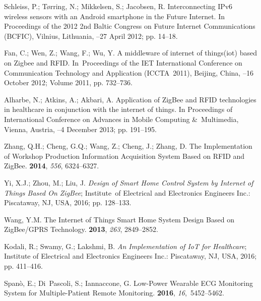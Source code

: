\documentclass[symmetry,article,accept,moreauthors,pdftex10pt,a4paper]{mdpi}
\begin{document}
\begin{thebibliography}{999}
Schleiss, P.; Tørring, N.; Mikkelsen, S.; Jacobsen, R.
\newblock Interconnecting IPv6 wireless sensors with an Android smartphone in
the Future Internet. In Proceedings of the 2012 2nd Baltic Congress on  Future Internet Communications (BCFIC), Vilnius, Lithuania, 
--27 April 2012; pp. 14--18.

Fan, C.; Wen, Z.; Wang, F.; Wu, Y.
\newblock A middleware of internet of things(iot) based on Zigbee and RFID. In~Proceedings of the IET International Conference on  Communication Technology and Application (ICCTA~2011),  Beijing, China,
--16 October 2012; Volume 2011, pp. 732--736.

Alharbe, N.; Atkins, A.; Akbari, A.
\newblock Application of ZigBee and RFID technologies in healthcare in
conjunction with the internet of things. In Proceedings of International Conference on Advances in Mobile Computing \&~Multimedia, Vienna, Austria,
--4 December 2013; pp. 191--195.

Zhang, Q.H.; Cheng, G.Q.; Wang, Z.; Cheng, J.; Zhang, D.
\newblock The Implementation of Workshop Production Information Acquisition
System Based on RFID and ZigBee.
 \textbf{2014}, \emph{556}, 6324--6327.

Yi, X.J.; Zhou, M.; Liu, J.
\newblock \emph{Design of Smart Home Control System by Internet of Things Based On
	ZigBee};
\newblock Institute~of Electrical and Electronics Engineers Inc.: Piscataway, NJ, USA, 2016; pp.
128--133.

Wang, Y.M.
\newblock The Internet of Things Smart Home System Design Based on ZigBee/GPRS
Technology.
 \textbf{2013}, \emph{263}, 2849--2852.

Kodali, R.; Swamy, G.; Lakshmi, B.
\newblock \emph{An Implementation of IoT for Healthcare};
\newblock Institute of Electrical and Electronics Engineers Inc.: Piscataway, NJ, USA, 2016; pp.
411--416.

Spanò, E.; Di~Pascoli, S.; Iannaccone, G.
\newblock Low-Power Wearable ECG Monitoring System for Multiple-Patient Remote
Monitoring.
 {\bf 2016}, {\em 16},~5452--5462.


\end{thebibliography}
\end{document}
